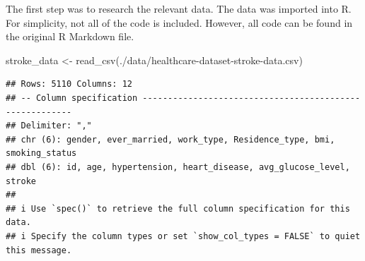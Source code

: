 \documentclass[
]{article}
\newenvironment{Shaded}{\begin{snugshade}}{\end{snugshade}}
\newcommand{\FunctionTok}[1]{\textcolor[rgb]{0.00,0.00,0.00}{#1}}
\newcommand{\NormalTok}[1]{#1}
\newcommand{\OtherTok}[1]{\textcolor[rgb]{0.56,0.35,0.01}{#1}}
\newcommand{\SpecialCharTok}[1]{\textcolor[rgb]{0.00,0.00,0.00}{#1}}
\newcommand{\StringTok}[1]{\textcolor[rgb]{0.31,0.60,0.02}{#1}}
\renewcommand{\=}[1]{\stackrel{#1}{=}}
\theoremstyle{definition}
\theoremstyle{remark}
\begin{document}
The first step was to research the relevant data. The data was imported into R. For simplicity, not all of the code is included. However, all code can be found in the original R Markdown file.

\begin{Shaded}
\begin{Highlighting}[]
\NormalTok{stroke\_data }\OtherTok{\textless{}{-}} \FunctionTok{read\_csv}\NormalTok{(}\StringTok{\textquotesingle{}./data/healthcare{-}dataset{-}stroke{-}data.csv\textquotesingle{}}\NormalTok{)}
\end{Highlighting}
\end{Shaded}

\begin{verbatim}
## Rows: 5110 Columns: 12
## -- Column specification --------------------------------------------------------
## Delimiter: ","
## chr (6): gender, ever_married, work_type, Residence_type, bmi, smoking_status
## dbl (6): id, age, hypertension, heart_disease, avg_glucose_level, stroke
## 
## i Use `spec()` to retrieve the full column specification for this data.
## i Specify the column types or set `show_col_types = FALSE` to quiet this message.
\end{verbatim}

\begin{Shaded}
\end{Shaded}
\end{document}
